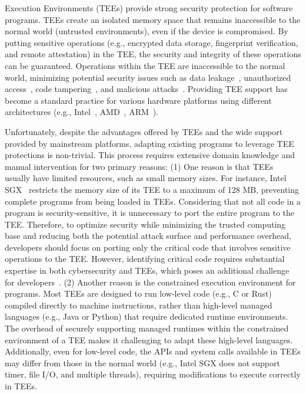  Execution Environments (TEEs) provide strong security protection for software programs.
TEEs create an isolated memory space that remains inaccessible to the normal world (untrusted environments), even if the device is compromised.
By putting sensitive operations (e.g., encrypted data storage, fingerprint verification, and remote attestation) in the TEE, the security and integrity of these operations can be guaranteed.
Operations within the TEE are inaccessible to the normal world, minimizing potential security issues such as data leakage~\cite{zhang2024no,liu2022extending,zhang2020privacyscope}, unauthorized access~\cite{9664230,han2023mytee,tkdeMaLLXJSM24,wang2023tee,ait2025tee}, code tampering~\cite{ahn2020diskshield,ZhaoM19ndss}, and malicious attacks~\cite{StathakopoulouR21,zhang2019softme}.
Providing TEE support has become a standard practice for various hardware platforms using different architectures (e.g., Intel~\cite{Intel_SGX,Intel_TDX}, AMD~\cite{AMD_SEV}, ARM~\cite{ARM_TrustZone}).


Unfortunately, despite the advantages offered by TEEs and the wide support provided by mainstream platforms, adapting existing programs to leverage TEE protections is non-trivial.
This process requires extensive domain knowledge and manual intervention for two primary reasons:
(1) One reason is that TEEs usually have limited resources, such as small memory sizes.
For instance, Intel SGX~\cite{Intel_SGX} restricts the memory size of its TEE to a maximum of 128 MB, preventing complete programs from being loaded in TEEs.
Considering that not all code in a program is security-sensitive, it is unnecessary to port the entire program to the TEE.
Therefore, to optimize security while minimizing the trusted computing base and reducing both the potential attack surface and performance overhead, developers should focus on porting only the critical code that involves sensitive operations to the TEE.
However, identifying critical code requires substantial expertise in both cybersecurity and TEEs, which poses an additional challenge for developers~\cite{zhang2024no,lind2017glamdring}.
(2) Another reason is the constrained execution environment for programs.
Most TEEs are designed to run low-level code (e.g., C or Rust) compiled directly to machine instructions, rather than high-level managed languages (e.g., Java or Python) that require dedicated runtime environments.
The overhead of securely supporting managed runtimes within the constrained environment of a TEE makes it challenging to adapt these high-level languages.
Additionally, even for low-level code, the APIs and system calls available in TEEs may differ from those in the normal world (e.g., Intel SGX does not support timer, file I/O, and multiple threads), requiring modifications to execute correctly in TEEs.


